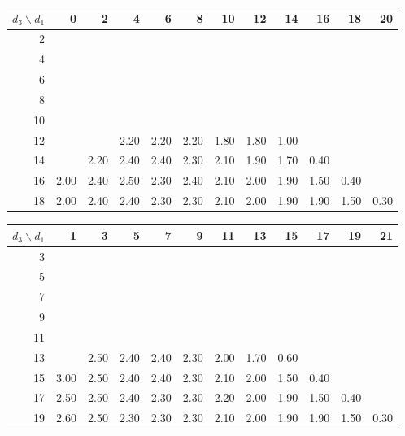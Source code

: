 \begin{tabular}{r|rrrrrrrrrrr}
\hline
$d_3 \backslash d_1$ & 0 & 2 & 4 & 6 & 8 & 10 & 12 & 14 & 16 & 18 & 20 \\
\hline
2 &  &  &  &  &  &  &  &  &  &  &  \\
4 &  &  &  &  &  &  &  &  &  &  &  \\
6 &  &  &  &  &  &  &  &  &  &  &  \\
8 &  &  &  &  &  &  &  &  &  &  &  \\
10 &  &  &  &  &  &  &  &  &  &  &  \\
12 &  &  & 2.20 & 2.20 & 2.20 & 1.80 & 1.80 & 1.00 &  &  &  \\
14 &  & 2.20 & 2.40 & 2.40 & 2.30 & 2.10 & 1.90 & 1.70 & 0.40 &  &  \\
16 & 2.00 & 2.40 & 2.50 & 2.30 & 2.40 & 2.10 & 2.00 & 1.90 & 1.50 & 0.40 &  \\
18 & 2.00 & 2.40 & 2.40 & 2.30 & 2.30 & 2.10 & 2.00 & 1.90 & 1.90 & 1.50 & 0.30 \\
\hline
\end{tabular}

\begin{tabular}{r|rrrrrrrrrrr}
\hline
$d_3 \backslash d_1$ & 1 & 3 & 5 & 7 & 9 & 11 & 13 & 15 & 17 & 19 & 21 \\
\hline
3 &  &  &  &  &  &  &  &  &  &  &  \\
5 &  &  &  &  &  &  &  &  &  &  &  \\
7 &  &  &  &  &  &  &  &  &  &  &  \\
9 &  &  &  &  &  &  &  &  &  &  &  \\
11 &  &  &  &  &  &  &  &  &  &  &  \\
13 &  & 2.50 & 2.40 & 2.40 & 2.30 & 2.00 & 1.70 & 0.60 &  &  &  \\
15 & 3.00 & 2.50 & 2.40 & 2.40 & 2.30 & 2.10 & 2.00 & 1.50 & 0.40 &  &  \\
17 & 2.50 & 2.50 & 2.40 & 2.30 & 2.30 & 2.20 & 2.00 & 1.90 & 1.50 & 0.40 &  \\
19 & 2.60 & 2.50 & 2.30 & 2.30 & 2.30 & 2.10 & 2.00 & 1.90 & 1.90 & 1.50 & 0.30 \\
\hline
\end{tabular}